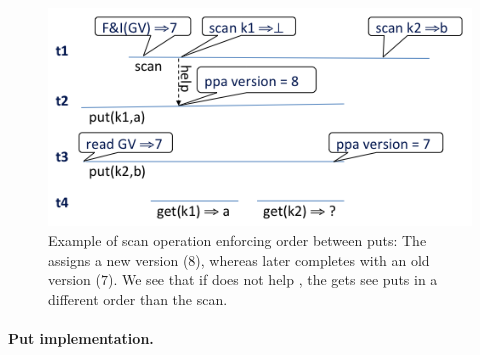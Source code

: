 \begin{figure}[tb]
\centerline{\includegraphics[width=0.85\columnwidth]{kiwi-linearization.png}}
\caption{Example of scan operation enforcing order between puts:
The  assigns
 a new version ($8$), whereas  later completes with an old version ($7$).
We see that if  does not help , the gets see puts in a  different order than the  scan.
}
\label{fig:linearization}
\end{figure}

\paragraph{Put implementation.}


